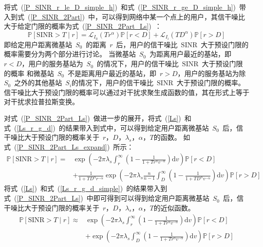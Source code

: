 将式~(\ref{P_SINR_r_le_D_simple_h})~和式~(\ref{P_SINR_r_ge_D_simple_h})~带入到式~(\ref{P_SINR_2Part})~中，可以得到网络中某一个点上的用户，其信干噪比大于给定门限的概率为式~(\ref{P_SINR_2Part_Ls})~：
\begin{equation}\label{P_SINR_2Part_Ls}
  \mathbb{P}[\mathrm{SINR}>T \mid r] = \mathcal{L}_{I_0}(Tr^\alpha)\mathbb{P}[r<D] + \mathcal{L}_{I_i}(TD^\alpha)\mathbb{P}[r>D]
\end{equation}
即给定用户距离微基站~$S_0$~的距离~$r$~后，用户的信干噪比~$\mathrm{SINR}$~大于预设门限的概率需要分为两个部分进行讨论。
当微基站~$S_0$~为距离用户最近的基站，即~$r < D$，用户的服务基站为~$S_0$~的情况下，用户的信干噪比~$\mathrm{SINR}$~大于预设门限的概率
和微基站~$S_0$~不是距离用户最近的基站，即~$r > D$，用户的服务基站为除~$S_0$~之外的其他基站~$S_i$的情况下，用户的信干噪比~$\mathrm{SINR}$~大于预设门限的概率。
信干噪比大于预设门限的概率可以通过对干扰求聚生成函数的值，其在形式上等于对干扰求拉普拉斯变换。

对式~(\ref{P_SINR_2Part_Ls})~做进一步的展开，将式~(\ref{Ls})~和式~(\ref{Ls_r_g_d})~的结果带入到式中，可以得到给定用户距离微基站~$S_0$~后，信干噪比大于预设门限的概率关于~$r$，$D$，$\lambda_s$，$\alpha$，$T$的函数。
如式~(\ref{P_SINR_2Part_Ls_expand})~所示：
\begin{equation}\label{P_SINR_2Part_Ls_expand}
  \begin{aligned}
  \mathbb{P}[\mathrm{SINR}>T \mid r] =& \exp\left(-2\pi\lambda_s\int_{r}^{\infty} \left(1 - \frac{1}{1+ T r ^\alpha v^{-\alpha}}\right)\mathrm{d}v\right) \mathbb{P}[r<D]\\
  & + \frac{1}{1+ T D ^\alpha r^{-\alpha}}\exp\left(-2\pi\lambda_s\frac{n}{n-1}\int_{D}^{\infty} \left(1 - \frac{1}{1+ T D ^\alpha v^{-\alpha}}\right)\mathrm{d}v\right)\mathbb{P}[r>D]
\end{aligned}\end{equation}
将式~(\ref{Ls})~和式~(\ref{Ls_r_g_d_simple})~的结果带入到式~(\ref{P_SINR_2Part_Ls})~中即可得到可以得到给定用户距离微基站~$S_0$~后，信干噪比大于预设门限的概率关于~$r$，$D$，$\lambda_s$，$\alpha$，$T$的近似函数。
\begin{equation}\label{P_SINR_2Part_Ls_expand}
  \begin{aligned}
  \mathbb{P}[\mathrm{SINR}>T \mid r] \approx & \exp\left(-2\pi\lambda_s\int_{r}^{\infty} \left(1 - \frac{1}{1+ T r ^\alpha v^{-\alpha}}\right)\mathrm{d}v\right)\mathbb{P}[r<D] \\
  & + \exp\left(-2\pi\lambda_s\int_{D}^{\infty} \left(1 - \frac{1}{1+ T r ^\alpha v^{-\alpha}}\right)\mathrm{d}v\right)\mathbb{P}[r>D]
\end{aligned}\end{equation}

